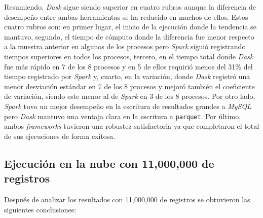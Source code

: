 Resumiendo, \textit{Dask} sigue siendo superior en cuatro rubros aunque la diferencia de desempeño entre ambas herramientas se ha reducido en muchos de ellos. Estos cuatro rubros son: en primer lugar, el inicio de la ejecución donde la tendencia se mantuvo, segundo, el tiempo de cómputo donde la diferencia fue menor respecto a la muestra anterior en algunos de los procesos pero \textit{Spark} siguió registrando tiempos superiores en todos los procesos, tercero, en el tiempo total donde \textit{Dask} fue más rápido en 7 de los 8 procesos y en 5 de ellos requirió menos del 31\% del tiempo registrado por \textit{Spark} y, cuarto, en la variación, donde \textit{Dask} registró una menor desviación estándar en 7 de los 8 procesos y mejoró también el coeficiente de variación, siendo este menor al de \textit{Spark} en 3 de los 8 procesos. Por otro lado, \textit{Spark} tuvo un mejor desempeño en la escritura de resultados grandes a \textit{MySQL} pero \textit{Dask} mantuvo una ventaja clara en la escritura a \texttt{parquet}. Por último, ambos \textit{frameworks} tuvieron una robustez satisfactoria ya que completaron el total de sus ejecuciones de forma exitosa.


\subsection{Ejecución en la nube con 11,000,000 de registros}

Después de analizar los resultados con 11,000,000 de registros se obtuvieron las siguientes conclusiones:

